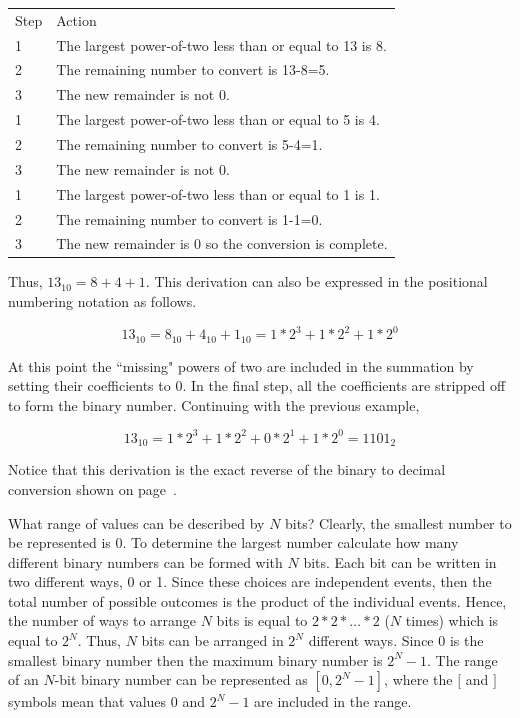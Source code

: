 \begin{tabular}{ll}
Step & Action \\
1 & The largest power-of-two less than or equal to 13 is 8. \\
2 & The remaining number to convert is 13-8=5. \\
3 & The new remainder is not 0. \\
1 & The largest power-of-two less than or equal to 5 is 4. \\
2 & The remaining number to convert is 5-4=1. \\
3 & The new remainder is not 0. \\
1 & The largest power-of-two less than or equal to 1 is 1. \\
2 & The remaining number to convert is 1-1=0. \\
3 & The new remainder is 0 so the conversion is complete. \\
\end{tabular}

Thus, $13_{10} = 8+4+1$.  This derivation can also be expressed in the
positional numbering notation as follows.

$$13_{10} = 8_{10} + 4_{10} + 1_{10} = 1*2^3 + 1*2^2 + 1*2^0 $$

At this point the ``missing" powers of two are included in the
summation by setting their coefficients to 0.  In the final step, all
the coefficients are stripped off to form the binary number.  Continuing
with the previous example,

$$13_{10} = 1*2^3 + 1*2^2 + 0*2^1 + 1*2^0 = 1101_2$$

Notice that this derivation is the exact reverse of the binary to
decimal conversion shown on page~\pageref{page:bin2dec}.  


\label{page:two-to-N}
What range of values can be described by $N$ bits?  Clearly, the smallest 
number to be represented is 0.  To determine the largest number 
calculate how many different binary numbers can be formed with $N$ bits.
Each bit can be written in two different ways, 0 or 1. Since these choices
are independent events, then the total number of 
possible outcomes is the product of the individual events.  Hence, the 
number of ways to arrange $N$ bits is equal to $2*2* \ldots *2$ ($N$ times) 
which is equal to $2^N$.  Thus, $N$ bits can be arranged in $2^N$ different 
ways. Since 0 is the smallest binary number then the maximum binary number
is $2^N-1$.  The range of an $N$-bit binary number can be represented
as $[0,2^{N}-1]$, where the $[$ and $]$ symbols mean that values 0 and
$2^{N}-1$ are included in the range. 


